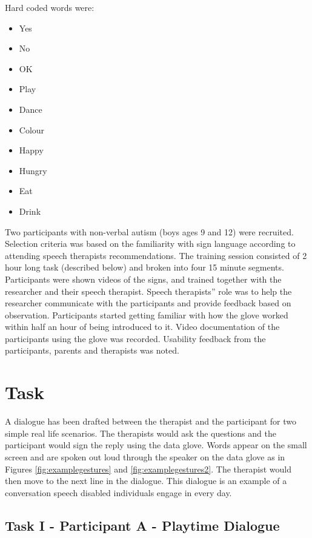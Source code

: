 Hard coded words were: 

\begin{itemize}
  \item Yes
  \item No
  \item OK
  \item Play
  \item Dance
  \item Colour
  \item Happy
  \item Hungry
  \item Eat
  \item Drink
\end{itemize}

Two participants with non-verbal autism (boys ages 9 and 12) were recruited. Selection criteria was based on the familiarity with sign language according to attending speech therapists recommendations. The training session consisted of 2 hour long task (described below) and broken into four 15 minute segments. Participants were shown videos of the signs, and trained together with the researcher and their speech therapist. Speech therapists'' role was to help the researcher communicate with the participants and provide feedback based on observation. Participants started getting familiar with how the glove worked within half an hour of being introduced to it. Video documentation of the participants using the glove was recorded. Usability feedback from the participants, parents and therapists was noted.

\section{Task}

A dialogue has been drafted between the therapist and the participant for two simple real life scenarios. The therapists would ask the questions and the participant would sign the reply using the data glove. Words appear on the small screen and are spoken out loud through the speaker on the data glove as in Figures \ref{fig:examplegestures} and \ref{fig:examplegestures2}. The therapist would then move to the next line in the dialogue. This dialogue is an example of a conversation speech disabled individuals engage in every day. 

\subsection{Task I - Participant A - Playtime Dialogue}

